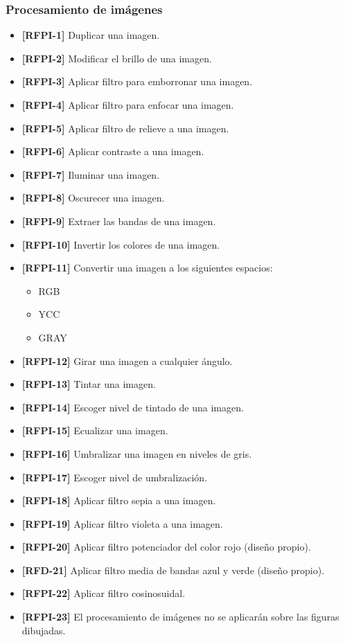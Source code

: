 \subsubsection{Procesamiento de imágenes}
\begin{itemize}
\item{\textbf{[RFPI-1]} Duplicar una imagen.}
\item{\textbf{[RFPI-2]} Modificar el brillo de una imagen.}
\item{\textbf{[RFPI-3]} Aplicar filtro para emborronar una imagen.}
\item{\textbf{[RFPI-4]} Aplicar filtro para enfocar una imagen.}
\item{\textbf{[RFPI-5]} Aplicar filtro de relieve a una imagen.}
\item{\textbf{[RFPI-6]} Aplicar contraste a una imagen.}
\item{\textbf{[RFPI-7]} Iluminar una imagen.}
\item{\textbf{[RFPI-8]} Oscurecer una imagen.}
\item{\textbf{[RFPI-9]} Extraer las bandas de una imagen.}
\item{\textbf{[RFPI-10]} Invertir los colores de una imagen.}
\item{\textbf{[RFPI-11]} Convertir una imagen a los siguientes espacios:
\begin{itemize}
\item{RGB}
\item{YCC}
\item{GRAY}
\end{itemize}
}
\item{\textbf{[RFPI-12]} Girar una imagen a cualquier ángulo.}
\item{\textbf{[RFPI-13]} Tintar una imagen.}
\item{\textbf{[RFPI-14]} Escoger nivel de tintado de una imagen.}
\item{\textbf{[RFPI-15]} Ecualizar una imagen.}
\item{\textbf{[RFPI-16]} Umbralizar una imagen en niveles de gris.}
\item{\textbf{[RFPI-17]} Escoger nivel de umbralización.}
\item{\textbf{[RFPI-18]} Aplicar filtro sepia a una imagen.}
\item{\textbf{[RFPI-19]} Aplicar filtro violeta a una imagen.}
\item{\textbf{[RFPI-20]} Aplicar filtro potenciador del color rojo (diseño propio).}
\item{\textbf{[RFD-21]} Aplicar filtro media de bandas azul y verde (diseño propio).}
\item{\textbf{[RFPI-22]} Aplicar filtro cosinosuidal.}
\item{\textbf{[RFPI-23]} El procesamiento de imágenes no se aplicarán sobre las figuras dibujadas.}
\end{itemize}
